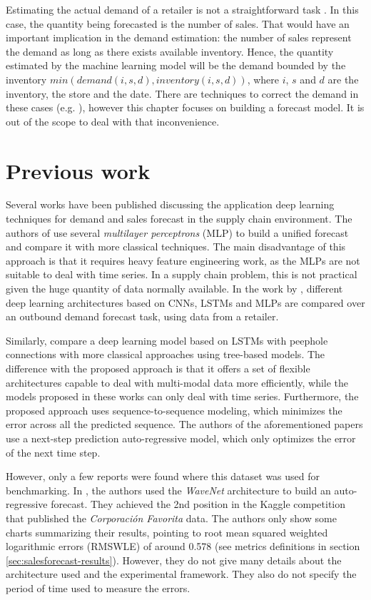 Estimating the actual demand of a retailer is not a straightforward task \autocite{Deep2019}. In this case, the quantity being forecasted is the number of sales. That would have an important implication in the demand estimation: the number of sales represent the demand as long as there exists available inventory. Hence, the quantity estimated by the machine learning model will be the demand bounded by the inventory $min(demand(i,s,d), inventory(i,s,d))$, where $i$, $s$ and $d$ are the inventory, the store and the date. There are techniques to correct the demand in these cases (e.g. \autocite{Bell2000}), however this chapter focuses on building a forecast model. It is out of the scope to deal with that inconvenience.

\section{Previous work}	\label{sec:salesforecast_prevwork}
Several works have been published discussing the application deep learning techniques for demand and sales forecast in the supply chain environment. The authors of \autocite{Kilimci2019} use several \textit{multilayer perceptrons} (MLP) to build a unified forecast and compare it with more classical techniques. The main disadvantage of this approach is that it requires heavy feature engineering work, as the MLPs are not suitable to deal with time series. In a supply chain problem, this is not practical given the huge quantity of data normally available. In the work by \autocite{Talupula2018}, different deep learning architectures based on CNNs, LSTMs and MLPs are compared over an outbound demand forecast task, using data from a retailer. 

Similarly, \autocite{Helmini2019} compare a deep learning model based on LSTMs with peephole connections with more classical approaches using tree-based models.  The difference with the proposed approach is that it offers a set of flexible architectures capable to deal with multi-modal data more efficiently, while the models proposed in these works can only deal with time series. Furthermore, the proposed approach uses sequence-to-sequence modeling, which minimizes the error across all the predicted sequence. The authors of the aforementioned papers use a next-step prediction auto-regressive model, which only optimizes the error of the next time step.

However, only a few reports were found where this dataset was used for benchmarking. In \autocite{kechyn2018}, the authors used the \textit{WaveNet} \autocite{vanderoord2016} architecture to build an auto-regressive forecast. They achieved the 2nd position in the Kaggle competition that published the \textit{Corporación Favorita} data. The authors only show some charts summarizing their results, pointing to root mean squared weighted logarithmic errors (RMSWLE) of around 0.578 (see metrics definitions in section \ref{sec:salesforecast-results}). However, they do not give many details about the architecture used and the experimental framework. They also do not specify the period of time used to measure the errors. 

